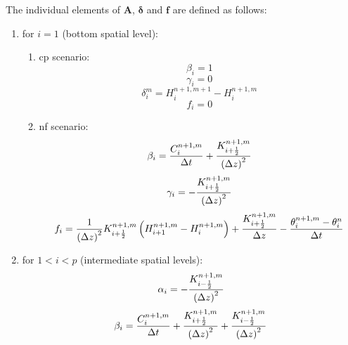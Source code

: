 The individual elements of $\mathbf A$, $\boldsymbol{\delta}$ and $\mathbf f$ are defined as follows:
\begin{enumerate}
\item for $i = 1$ (bottom spatial level):
  \begin{enumerate}
  \item cp scenario:
    \begin{equation}
      \label{eq:beta_bottom}
      \beta_i = 1
    \end{equation}
    \begin{equation}
      \label{eq:gamma_bottom}
      \gamma_i = 0
    \end{equation}
    \begin{equation}
      \label{eq:delta_bottom}
      \delta_i^m = H_i^{n+1,m+1} - H_i^{n+1,m}
    \end{equation}
    \begin{equation}
      \label{eq:f_bottom}
      f_i = 0
    \end{equation}
  \item nf scenario:
    \begin{equation}
      \label{eq:beta_bottom}
      \beta_i = \frac{C_i^{n+1,m}}{\Delta t} + \frac{K_{i+\frac{1}{2}}^{n+1,m}}{\del{ \Delta z }^2}
    \end{equation}
    \begin{equation}
      \label{eq:gamma_bottom}
      \gamma_i = - \frac{K_{i+\frac{1}{2}}^{n+1,m}}{\del{ \Delta z }^2}
    \end{equation}
    \begin{equation}
      \label{eq:f_bottom}
      f_i = \frac{1}{\del{ \Delta z }^2} K_{i+\frac{1}{2}}^{n+1,m} \del{ H_{i+1}^{n+1,m} - H_{i}^{n+1,m}} + \frac{K_{i+\frac{1}{2}}^{n+1,m}}{\Delta z} - \frac{\theta_i^{n+1,m} - \theta_i^{n}}{\Delta t}
    \end{equation}
  \end{enumerate}
\item for $1 < i < p$ (intermediate spatial levels):
  \begin{equation}
    \label{eq:alpha_intermediate}
    \alpha_i = - \frac{K_{i-\frac{1}{2}}^{n+1,m}}{\del{ \Delta z }^2}
  \end{equation}
  \begin{equation}
    \label{eq:beta_intermediate}
    \beta_i = \frac{C_i^{n+1,m}}{\Delta t} + \frac{K_{i+\frac{1}{2}}^{n+1,m}}{\del{ \Delta z }^2} + \frac{K_{i-\frac{1}{2}}^{n+1,m}}{\del{ \Delta z }^2}
  \end{equation}

\end{enumerate}
